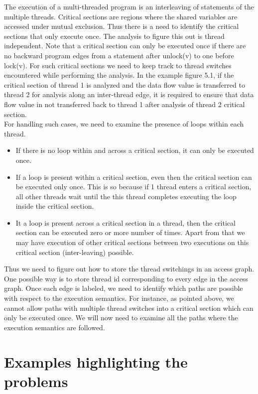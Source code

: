 The execution of a multi-threaded program is an interleaving of statements of the multiple threads. Critical sections are regions where the shared variables are accessed under mutual exclusion. Thus there is a need to identify the critical sections that only execute once. The analysis to figure this out is thread independent. Note that a critical section can only be executed once if there are no backward program edges from a statement after unlock(v) to one before lock(v). For such critical sections we need to keep track to thread switches encountered while performing the analysis. In the example figure 5.1, if the critical section of thread 1 is analyzed and the data flow value is transferred to thread 2 for analysis along an inter-thread edge, it is required to ensure that data flow value in not transferred back to thread 1 after analysis of thread 2 critical section. \\


For handling such cases, we need to examine the presence of loops within each thread. 
\begin{itemize}
	\item If there is no loop within and across a critical section, it can only be executed once.
	\item If a loop is present within a critical section, even then the critical section can be executed only once. This is so because if 1 thread enters a critical section, all other threads wait until the this thread completes executing the loop inside the critical section.
	\item It a loop is present across a critical section in a thread, then the critical section can be executed zero or more number of times. Apart from that we may have execution of other critical sections between two executions on this critical section (inter-leaving) possible.
\end{itemize} 

Thus we need to figure out how to store the thread switchings in an access graph. One possible way is to store thread id corresponding to every edge in the access graph. Once each edge is labeled, we need to identify which paths are possible with respect to the execution semantics. For instance, as pointed above, we cannot allow paths with multiple thread switches into a critical section which can only be executed once. We will now need to examine all the paths where the execution semantics are followed. \\

\section{Examples highlighting the problems}

